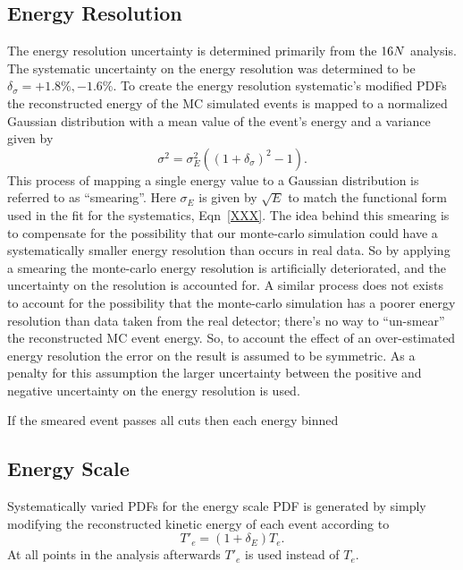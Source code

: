 \subsection{Energy Resolution}
The energy resolution uncertainty is determined primarily from the $\ce{16}N$ analysis.
The systematic uncertainty on the energy resolution was determined to be $\delta_{\sigma} = +1.8\%, -1.6\%$. %
To create the energy resolution systematic's modified PDFs the reconstructed
energy of the MC simulated events is mapped to a normalized Gaussian distribution with a
mean value of the event's energy and a
variance given by
\begin{equation}
  \sigma^{2} = \sigma_{E}^{2}\left(\left(1 + \delta_{\sigma}\right)^2 - 1\right)\text{.}
  \label{eqn:systmatic_esmear}
\end{equation}
This process of mapping a single energy value to a Gaussian distribution is referred to as ``smearing''.
Here $\sigma_{E}$ is given by $\sqrt{E}$ to match the functional form used in the fit for the systematics,
Eqn~\ref{XXX}.
The idea behind this smearing is to compensate for the possibility that our monte-carlo simulation could have
a systematically smaller energy resolution than occurs in real data.
So by applying a smearing the monte-carlo energy resolution is artificially deteriorated, and the uncertainty
on the resolution is accounted for.
A similar process does not exists to account for the possibility that the monte-carlo simulation has a poorer
energy resolution than data taken from the real detector; there's no way to ``un-smear'' the reconstructed MC
event energy.
So, to account the effect of an over-estimated energy resolution the error on the result is assumed to be symmetric.
As a penalty for this assumption the larger uncertainty between the positive and negative uncertainty on the
energy resolution is used.

If the smeared event passes all cuts then each energy binned

\subsection{Energy Scale}
Systematically varied PDFs for the energy scale PDF is generated by simply modifying the reconstructed
kinetic energy of each event according to
\begin{equation}
  T\prime_{e} = (1+\delta_{E})T_{e}\text{.}
\end{equation}
At all points in the analysis afterwards $T\prime_{e}$ is used instead of $T_{e}$.
